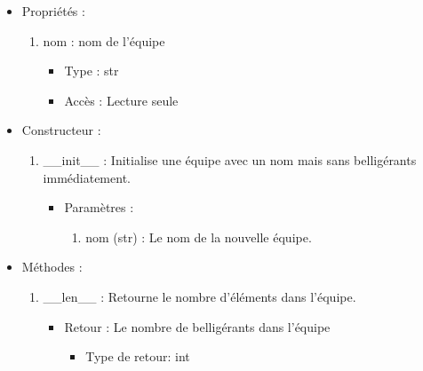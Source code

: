 \documentclass[12pt,pdftex,oneside]{article}
\begin{document}
  \begin{itemize}
  \item Propriétés : 
    \begin{enumerate}
    \item nom : nom de l'équipe
          \begin{itemize}
          \item Type : str
          \item Accès : Lecture seule
          \end{itemize}

    \end{enumerate}

  \item Constructeur : 

  \begin{enumerate}
  \item \_\_init\_\_ : Initialise une équipe avec un nom mais sans belligérants
    immédiatement.
    \begin{itemize}
    \item Paramètres : 
      \begin{enumerate}
      \item nom (str) : Le nom de la nouvelle équipe.
      \end{enumerate}
    \end{itemize}

  \end{enumerate}

  \item Méthodes : 

    \begin{enumerate}
    \item \_\_len\_\_ : Retourne le nombre d'éléments dans l'équipe.
      \begin{itemize}
      \item Retour : Le nombre de belligérants dans l'équipe
          \begin{itemize}
          \item Type de retour: int
          \end{itemize}
      \end{itemize}


\end{enumerate}
\end{itemize}
\end{document}
